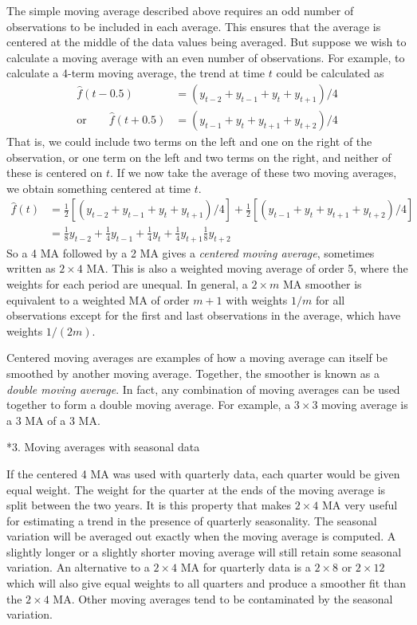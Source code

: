 \documentclass[10pt]{article}
\makeatletter
\newcommand{\smfrac}[2]{{\scriptstyle\frac{#1}{#2}}}
\renewcommand{\section}%
{\@startsection{section}{1}{0mm}{\baselineskip}{0.5\baselineskip}{\normalfont\large\rmfamily\bfseries}}
\makeatother
\begin{document}
The simple moving average described above requires an odd number of observations to be included in each average.  This ensures that the average is centered at the middle of the data values being averaged. But suppose we wish to calculate a moving average with an even number of observations.  For example, to calculate a 4-term moving average, the trend at time $t$ could be calculated as
\begin{align*}
\hat{f}(t-0.5) &= (y_{t-2} + y_{t-1} + y_t + y_{t+1})/4 \\
\text{or}\qquad\hat{f}(t+0.5) &= (y_{t-1} + y_{t} + y_{t+1} + y_{t+2})/4
\end{align*}
That is, we could include two terms on the left and one on the right of the observation, or one term on the left and two terms on the right, and neither of these is centered on $t$. If we now take the average of these two moving averages, we obtain something centered at time $t$.
\begin{align*}
\hat{f}(t) &= \smfrac12\left[ (y_{t-2} + y_{t-1} + y_t + y_{t+1})/4\right] + \smfrac12\left[(y_{t-1} + y_{t} + y_{t+1} + y_{t+2})/4\right] \\
&= \smfrac18 y_{t-2} + \smfrac14 y_{t-1} + \smfrac14 y_t + \smfrac14 y_{t+1} \smfrac18  y_{t+2}
\end{align*}
So a 4 MA followed by a 2 MA gives a \textit{centered moving average}, sometimes written as $2\times4$ MA.
This is also a weighted moving average of order 5, where the weights for each period are unequal.
In general, a $2\times m$ MA smoother is equivalent to a weighted MA of order $m+1$ with weights $1/m$ for all observations except for the first and last observations in the average, which have weights $1/(2m)$.

Centered moving averages are examples of how a moving average can itself be smoothed by another moving average.  Together, the smoother is known as a \emph{double moving average}.  In fact, any combination of moving averages can be used together to form a double moving average.  For example, a $3\times3$ moving average is a 3 MA of a 3 MA.

\section*{3. Moving averages with seasonal data}

If the centered 4 MA  was used with quarterly data, each quarter would be given equal weight.  The weight for the quarter at the ends of the moving average is split between the two years.  It is this property that makes $2\times4$ MA very useful for estimating a trend in the presence of quarterly seasonality.  The seasonal variation will be averaged out exactly when the moving average is computed.  A slightly longer or a slightly shorter moving average will still retain some seasonal variation.  An alternative to a $2\times4$ MA for quarterly data is a $2\times8$ or $2\times12$ which will also give equal weights to all quarters and produce a smoother fit than the $2\times4$ MA.
Other moving averages tend to be contaminated by the seasonal variation.
\end{document}
